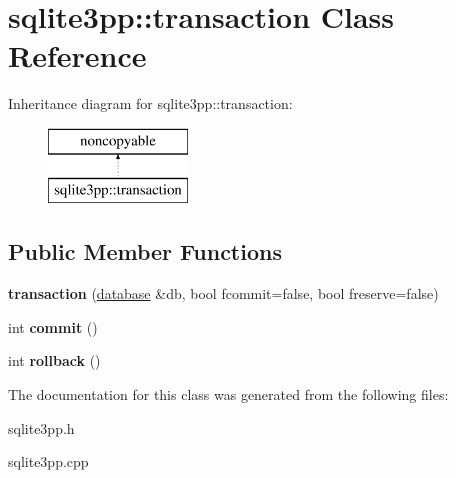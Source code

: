\hypertarget{classsqlite3pp_1_1transaction}{\section{sqlite3pp\-:\-:transaction Class Reference}
\label{classsqlite3pp_1_1transaction}
}
Inheritance diagram for sqlite3pp\-:\-:transaction\-:\begin{figure}[H]
\begin{center}
\leavevmode
\includegraphics[height=2.000000cm]{classsqlite3pp_1_1transaction}
\end{center}
\end{figure}
\subsection*{Public Member Functions}
\begin{DoxyCompactItemize}
\item 
\hypertarget{classsqlite3pp_1_1transaction_ad5cdb7bd3463e42b1764397b11cdfd0e}{{\bfseries transaction} (\hyperlink{classsqlite3pp_1_1database}{database} \&db, bool fcommit=false, bool freserve=false)}\label{classsqlite3pp_1_1transaction_ad5cdb7bd3463e42b1764397b11cdfd0e}

\item 
\hypertarget{classsqlite3pp_1_1transaction_abe9d351fd9cdd99b5f1e418e79df687f}{int {\bfseries commit} ()}\label{classsqlite3pp_1_1transaction_abe9d351fd9cdd99b5f1e418e79df687f}

\item 
\hypertarget{classsqlite3pp_1_1transaction_a319bebdd5cb0a9dce97da274ff5d139d}{int {\bfseries rollback} ()}\label{classsqlite3pp_1_1transaction_a319bebdd5cb0a9dce97da274ff5d139d}

\end{DoxyCompactItemize}


The documentation for this class was generated from the following files\-:\begin{DoxyCompactItemize}
\item 
sqlite3pp.\-h\item 
sqlite3pp.\-cpp\end{DoxyCompactItemize}
